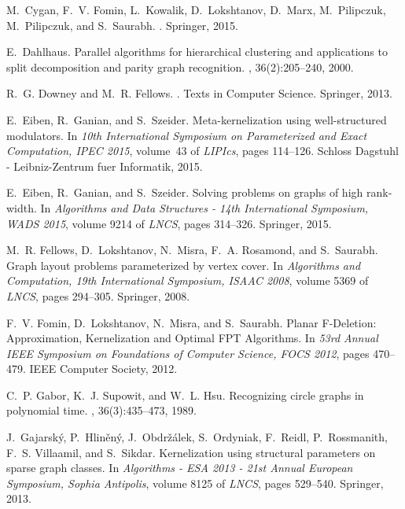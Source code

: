 \documentclass[11pt]{elsarticle}
\begin{document}
\begin{thebibliography}{10}
M.~Cygan, F.~V. Fomin, L.~Kowalik, D.~Lokshtanov, D.~Marx, M.~Pilipczuk,
  M.~Pilipczuk, and S.~Saurabh.
.
\newblock Springer, 2015.

E.~Dahlhaus.
\newblock Parallel algorithms for hierarchical clustering and applications to
  split decomposition and parity graph recognition.
, 36(2):205--240, 2000.

R.~G. Downey and M.~R. Fellows.
.
\newblock Texts in Computer Science. Springer, 2013.

E.~Eiben, R.~Ganian, and S.~Szeider.
\newblock Meta-kernelization using well-structured modulators.
\newblock In {\em 10th International Symposium on Parameterized and Exact
  Computation, {IPEC} 2015}, volume~43 of {\em LIPIcs}, pages 114--126. Schloss
  Dagstuhl - Leibniz-Zentrum fuer Informatik, 2015.

E.~Eiben, R.~Ganian, and S.~Szeider.
\newblock Solving problems on graphs of high rank-width.
\newblock In {\em Algorithms and Data Structures - 14th International
  Symposium, {WADS} 2015}, volume 9214 of {\em LNCS}, pages 314--326. Springer,
  2015.

M.~R. Fellows, D.~Lokshtanov, N.~Misra, F.~A. Rosamond, and S.~Saurabh.
\newblock Graph layout problems parameterized by vertex cover.
\newblock In {\em Algorithms and Computation, 19th International Symposium,
  {ISAAC} 2008}, volume 5369 of {\em LNCS}, pages 294--305. Springer, 2008.

F.~V. Fomin, D.~Lokshtanov, N.~Misra, and S.~Saurabh.
\newblock Planar {F}-{D}eletion: Approximation, {K}ernelization and {O}ptimal
  {FPT} {A}lgorithms.
\newblock In {\em 53rd Annual {IEEE} Symposium on Foundations of Computer
  Science, {FOCS} 2012}, pages 470--479. {IEEE} Computer Society, 2012.

C.~P. Gabor, K.~J. Supowit, and W.~L. Hsu.
\newblock Recognizing circle graphs in polynomial time.
, 36(3):435--473, 1989.

J.~Gajarsk{\'{y}}, P.~Hlin{\v{e}}n{\'y}, J.~Obdr\v{z}\'{a}lek, S.~Ordyniak,
  F.~Reidl, P.~Rossmanith, F.~S. Villaamil, and S.~Sikdar.
\newblock Kernelization using structural parameters on sparse graph classes.
\newblock In {\em Algorithms - {ESA} 2013 - 21st Annual European Symposium,
  Sophia Antipolis}, volume 8125 of {\em LNCS}, pages 529--540. Springer, 2013.


\end{thebibliography}
\end{document}
